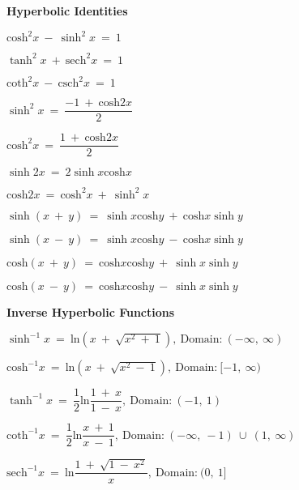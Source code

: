 \documentclass{article}
\begin{document}
\begin{large}
\textbf{Hyperbolic Identities}

\hspace{0.1in} $\text{cosh}^{2}x\ -\ \sinh ^{2}x\ =\ 1$

\hspace{0.1in} $\tanh^{2}x\ +\ \text{sech}^{2}x\ =\ 1$

\hspace{0.1in} $\text{coth}^{2}x\ -\ \text{csch}^{2}x\ =\ 1$

\hspace{0.1in} $\sinh^{2}x\ =\ \dfrac{-1\ +\ \text{cosh}2x}{2}$

\hspace{0.1in} $\text{cosh}^{2}x\ =\ \dfrac{1\ +\ \text{cosh}2x}{2}$

\hspace{0.1in} $\sinh 2x\ =\ 2\sinh x\text{cosh}x$

\hspace{0.1in} $\text{cosh}2x\ =\ \text{cosh}^{2}x\ +\ \sinh ^{2}x$

\hspace{0.1in} $\sinh (x\ +\ y)\ =\ \sinh x\text{cosh}y\ +\ \text{cosh}x\sinh y$

\hspace{0.1in} $\sinh (x\ -\ y)\ =\ \sinh x\text{cosh}y\ -\ \text{cosh}x\sinh y$

\hspace{0.1in} $\text{cosh}(x\ +\ y)\ =\ \text{cosh}x\text{cosh}y\ +\ \sinh x\sinh y$

\hspace{0.1in} $\text{cosh}(x\ -\ y)\ =\ \text{cosh}x\text{cosh}y\ -\ \sinh x\sinh y$

\textbf{Inverse Hyperbolic Functions}

\hspace{0.1in} $\sinh ^{-1}x\ =\ \text{ln}(x\ +\ \sqrt{x^{2}\ +\ 1}),\ \text{Domain:}\ (-\infty,\ \infty)$

\hspace{0.1in} $\text{cosh}^{-1}x\ =\ \text{ln}(x\ +\ \sqrt{x^{2}\ -\ 1}),\ \text{Domain:}\ [-1,\ \infty)$

\hspace{0.1in} $\tanh ^{-1}x\ =\ \dfrac{1}{2}\text{ln}\dfrac{1\ +\ x}{1\ -\ x},\ \text{Domain:}\ (-1,\ 1)$

\hspace{0.1in} $\text{coth}^{-1}x\ =\ \dfrac{1}{2}\text{ln}\dfrac{x\ +\ 1}{x\ -\ 1},\ \text{Domain:}\ (-\infty,\ -1)\ \cup\ (1,\ \infty)$

\hspace{0.1in} $\text{sech}^{-1}x\ =\ \text{ln}\dfrac{1\ +\ \sqrt{1\ -\ x^{2}}}{x},\ \text{Domain:}\ (0,\ 1]$


\end{large}
\end{document}
